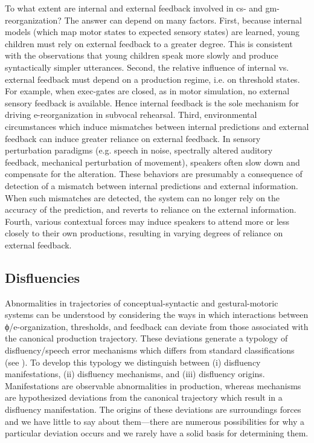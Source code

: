   To what extent are internal and external feedback involved in cs- and gm- reorganization? The answer can depend on many factors. First, because internal models (which map motor states to expected sensory states) are learned, young children must rely on external feedback to a greater degree. This is consistent with the observations that young children speak more slowly and produce syntactically simpler utterances. Second, the relative influence of internal vs. external feedback must depend on a production regime, i.e. on threshold states. For example, when exec-gates are closed, as in motor simulation, no external sensory feedback is available. Hence internal feedback is the sole mechanism for driving e-reorganization in subvocal rehearsal. Third, environmental circumstances which induce mismatches between internal predictions and external feedback can induce greater reliance on external feedback. In sensory perturbation paradigms (e.g. speech in noise, spectrally altered auditory feedback, mechanical perturbation of movement), speakers often slow down and compensate for the alteration. These behaviors are presumably a consequence of detection of a mismatch between internal predictions and external information. When such mismatches are detected, the system can no longer rely on the accuracy of the prediction, and reverts to reliance on the external information. Fourth, various contextual forces may induce speakers to attend more or less closely to their own productions, resulting in varying degrees of reliance on external feedback.

\subsection{Disfluencies}

Abnormalities in trajectories of conceptual-syntactic and gestural-motoric systems can be understood by considering the ways in which interactions between ϕ/e-organization, thresholds, and feedback can deviate from those associated with the canonical production trajectory. These deviations generate a typology of disfluency/speech error mechanisms which differs from standard classifications (see \citealt{Fromkin1971,Fromkin1984,Shriberg2001}). To develop this typology we distinguish between (i) disfluency manifestations, (ii) disfluency mechanisms, and (iii) disfluency origins. Manifestations are observable abnormalities in production, whereas mechanisms are hypothesized deviations from the canonical trajectory which result in a disfluency manifestation. The origins of these deviations are surroundings forces and we have little to say about them—there are numerous possibilities for why a particular deviation occurs and we rarely have a solid basis for determining them. 


